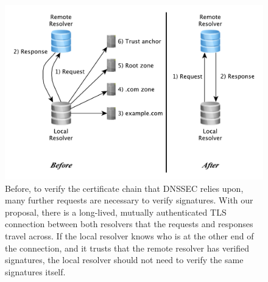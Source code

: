 \begin{figure}
  \centering
  \includegraphics[width=1.0\columnwidth]{figures/before-and-after}
  \caption{Before, to verify the certificate chain that DNSSEC relies upon, many further requests are necessary to verify signatures. With our proposal, there is a long-lived, mutually authenticated TLS connection between both resolvers that the requests and responses travel across. If the local resolver knows who is at the other end of the connection, and it trusts that the remote resolver has verified signatures, the local resolver should not need to verify the same signatures itself.}
  \label{fig:before-and-after}
\end{figure}






